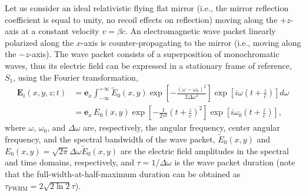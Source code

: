 \documentclass[10pt, a4paper, twoside, openright]{report}
\renewcommand{\vec}[1]{\mathbf{#1}}
\begin{document}
Let us consider an ideal relativistic flying flat mirror (i.e., the mirror reflection coefficient is equal to unity, no recoil effects on reflection) moving along the $ +z $-axis at a constant velocity $ v = \beta c $. An electromagnetic wave packet linearly polarized along the $ x $-axis is counter-propagating to the mirror (i.e., moving along the $ -z $-axis). The wave packet consists of a superposition of monochromatic waves, thus its electric field can be expressed in a stationary frame of reference, $ S_1 $, using the Fourier transformation,
\begin{equation}\label{eq:incident_lab_frame_1}
\begin{split}
\vec{E}_i \left(x, y, z; t \right) &= \vec{e}_x \int_{-\infty}^{+\infty} \tilde{E}_0 \left(x, y \right) \exp \left[ -\frac{\left( \omega - \omega_0 \right)^2}{2 \Delta \omega^2} \right] \exp \left[ i \omega \left(t + \frac{z}{c}\right) \right] d \omega \\
&= \vec{e}_x \, E_0 \left(x, y \right) \exp \left[ - \frac{1}{2 \tau^2} \left(t + \frac{z}{c}\right)^2 \right] \exp \left[ i \omega_0 \left(t + \frac{z}{c}\right) \right],
\end{split}
\end{equation}
where $ \omega $, $ \omega_0 $, and $ \Delta \omega $ are, respectively, the angular frequency, center angular frequency, and the spectral bandwidth of the wave packet, $ \tilde{E}_0 \left(x, y \right) $ and $ E_0 \left(x, y \right) = \sqrt{2 \pi} \Delta \omega \tilde{E}_0 \left(x, y \right) $ are the electric field amplitudes in the spectral and time domains, respectively, and $ \tau = 1 / \Delta \omega $ is the wave packet duration (note that the full-width-at-half-maximum duration can be obtained as $ \tau_{\mathrm{FWHM}} = 2 \sqrt{2 \ln 2} \tau $).

\end{document}
